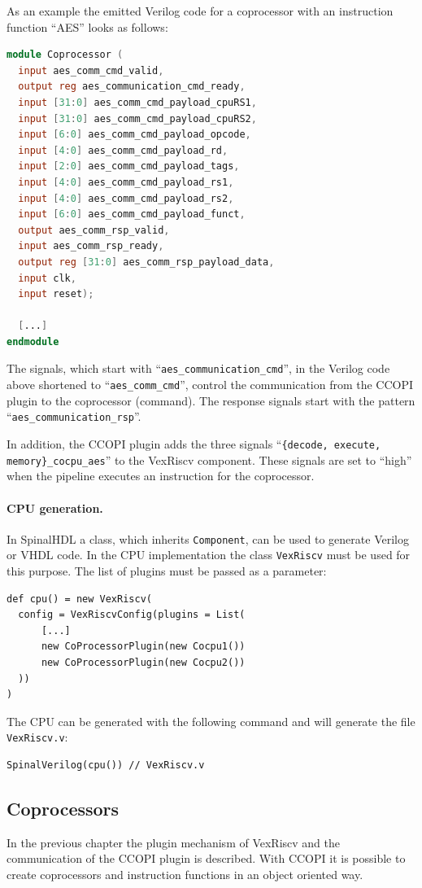\documentclass[twoside,twocolumn]{article}
\newcommand{\code}[1]{\texttt{#1}}
\begin{document}
As an example the emitted Verilog code for a coprocessor with an instruction 
function ``AES'' looks as follows:
\begin{lstlisting}[language=Verilog]
module Coprocessor (
  input aes_comm_cmd_valid,
  output reg aes_communication_cmd_ready,
  input [31:0] aes_comm_cmd_payload_cpuRS1,
  input [31:0] aes_comm_cmd_payload_cpuRS2,
  input [6:0] aes_comm_cmd_payload_opcode,
  input [4:0] aes_comm_cmd_payload_rd,
  input [2:0] aes_comm_cmd_payload_tags,
  input [4:0] aes_comm_cmd_payload_rs1,
  input [4:0] aes_comm_cmd_payload_rs2,
  input [6:0] aes_comm_cmd_payload_funct,
  output aes_comm_rsp_valid,
  input aes_comm_rsp_ready,
  output reg [31:0] aes_comm_rsp_payload_data,
  input clk,
  input reset);

  [...]
endmodule
\end{lstlisting}
The signals, which start with ``\code{aes\_communication\_cmd}'', in
the Verilog code above shortened to ``\code{aes\_comm\_cmd}'', control the
communication from the CCOPI plugin to the coprocessor (command). The
response signals start with the pattern ``\code{aes\_communication\_rsp}''.

In addition, the CCOPI plugin adds the three signals ``\code{\{decode,
execute, memory\}\_cocpu\_aes}'' to the VexRiscv component. These signals are
set to ``high'' when the pipeline executes an instruction for the
coprocessor.

\paragraph{CPU generation.} In SpinalHDL a class, which inherits
\code{Component}, can be used to generate Verilog or VHDL code. In the
CPU implementation the class \code{VexRiscv} must be used for this
purpose. The list of plugins must be passed as a parameter:
\begin{lstlisting}
def cpu() = new VexRiscv(
  config = VexRiscvConfig(plugins = List(
      [...]
      new CoProcessorPlugin(new Cocpu1())
      new CoProcessorPlugin(new Cocpu2())
  ))
)
\end{lstlisting}
The CPU can be generated with the following command and will generate
the file \code{VexRiscv.v}:
\begin{lstlisting}
SpinalVerilog(cpu()) // VexRiscv.v
\end{lstlisting}

\subsection{Coprocessors}
In the previous chapter the plugin mechanism of VexRiscv and the
communication of the CCOPI plugin is described. With CCOPI it is possible
to create coprocessors and instruction functions in an object oriented way.
\end{document}

